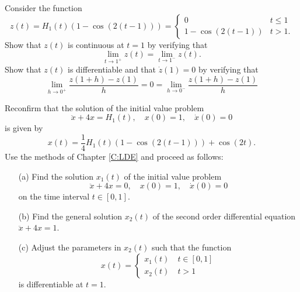 \documentclass{ximera}
\begin{document}
\EXER

\TEXER

\begin{exercise}  \label{Ex:cont}
Consider the function
\[
z(t) = H_1(t)(1-\cos(2(t-1))) = \left\{
\begin{array}{cl} 0 & t \leq 1 \\ 1-\cos(2(t-1)) & t > 1. \end{array}\right.
\]
Show that $z(t)$ is continuous at $t=1$ by verifying that 
\[
\lim_{t\to 1^+}z(t) = \lim_{t\to 1^-}z(t).
\]
Show that $z(t)$ is differentiable and that $\dot{z}(1)=0$ by verifying that 
\[
\lim_{h\to 0^+} \frac{z(1+h)-z(1)}{h} = 0 = 
\lim_{h\to 0^-} \frac{z(1+h)-z(1)}{h}
\]
\end{exercise}

\begin{exercise} \label{c13.4.2}
Reconfirm that the solution of the initial value problem
\[
\ddot x + 4 x=H_1(t),\quad x(0)=1,\quad \dot x(0)=0
\]
is given by
\[
x(t)=\frac{1}{4}H_1(t)(1-\cos(2(t-1))) + \cos(2t).
\]
Use the methods of Chapter \ref{C:LDE} and proceed as follows:
\begin{itemize}
\item[(a)] Find the solution $x_1(t)$ of the initial value problem
\[
\ddot x + 4 x=0,\quad x(0)=1,\quad \dot x(0)=0
\]
on the time interval $t\in[0,1]$.
\item[(b)] Find the general solution $x_2(t)$ of the second order
differential equation $\ddot x + 4 x=1$.
\item[(c)] Adjust the parameters in $x_2(t)$ such that the function
\[
x(t)=\left\{ \begin{array}{l} x_1(t)\quad t\in[0,1]\\
x_2(t) \quad t>1 \end{array}\right.
\]
is differentiable at $t=1$.
\end{itemize}
\end{exercise}



\CEXER
\end{document}
